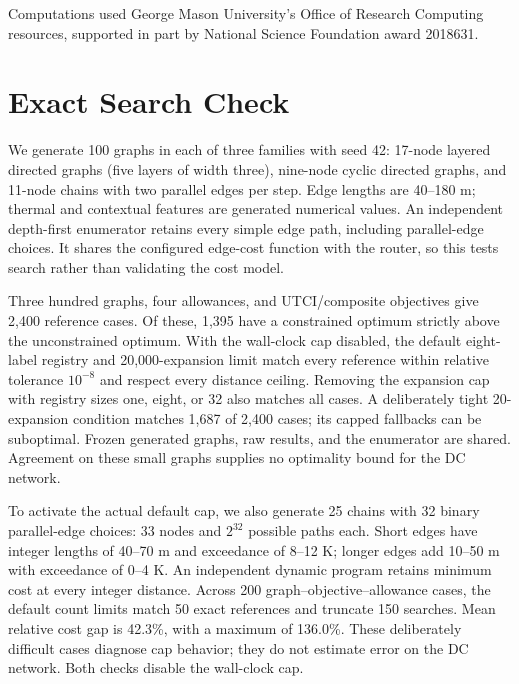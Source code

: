 \documentclass[sigconf,nonacm]{acmart}
\begin{document}
\begin{acks}
Computations used George Mason University's Office of Research Computing resources, supported in part by National Science Foundation award 2018631.
\end{acks}




\appendix
\section{Exact Search Check}\label{app:oracle}
We generate 100 graphs in each of three families with seed 42: 17-node layered directed graphs (five layers of width three), nine-node cyclic directed graphs, and 11-node chains with two parallel edges per step. Edge lengths are 40--180 m; thermal and contextual features are generated numerical values. An independent depth-first enumerator retains every simple edge path, including parallel-edge choices. It shares the configured edge-cost function with the router, so this tests search rather than validating the cost model.

Three hundred graphs, four allowances, and UTCI/composite objectives give 2,400 reference cases. Of these, 1,395 have a constrained optimum strictly above the unconstrained optimum. With the wall-clock cap disabled, the default eight-label registry and 20,000-expansion limit match every reference within relative tolerance $10^{-8}$ and respect every distance ceiling. Removing the expansion cap with registry sizes one, eight, or 32 also matches all cases. A deliberately tight 20-expansion condition matches 1,687 of 2,400 cases; its capped fallbacks can be suboptimal. Frozen generated graphs, raw results, and the enumerator are shared. Agreement on these small graphs supplies no optimality bound for the DC network.

To activate the actual default cap, we also generate 25 chains with 32 binary parallel-edge choices: 33 nodes and $2^{32}$ possible paths each. Short edges have integer lengths of 40--70 m and exceedance of 8--12 K; longer edges add 10--50 m with exceedance of 0--4 K. An independent dynamic program retains minimum cost at every integer distance. Across 200 graph--objective--allowance cases, the default count limits match 50 exact references and truncate 150 searches. Mean relative cost gap is 42.3\%, with a maximum of 136.0\%. These deliberately difficult cases diagnose cap behavior; they do not estimate error on the DC network. Both checks disable the wall-clock cap.
\end{document}
